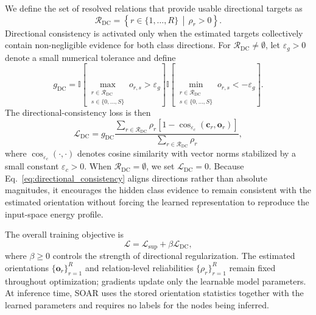 \documentclass[10pt,journal]{IEEEtran}
\begin{document}
We define the set of resolved relations that provide usable directional
targets as
\begin{equation}
\mathcal{R}_{\mathrm{DC}}
=
\left\{
r\in\{1,\ldots,R\}
\,\middle|\,
\rho_r>0
\right\}.
\label{eq:dc_relations}
\end{equation}
Directional consistency is activated only when the estimated targets
collectively contain non-negligible evidence for both class directions.
For $\mathcal{R}_{\mathrm{DC}}\neq\emptyset$, let $\varepsilon_g>0$ denote
a small numerical tolerance and define
\begin{equation}
g_{\mathrm{DC}}
=
\mathbb{I}
\left[
\max_{\substack{
r\in\mathcal{R}_{\mathrm{DC}}\\
s\in\{0,\ldots,S\}
}}
o_{r,s}
>
\varepsilon_g
\right]
\mathbb{I}
\left[
\min_{\substack{
r\in\mathcal{R}_{\mathrm{DC}}\\
s\in\{0,\ldots,S\}
}}
o_{r,s}
<
-\varepsilon_g
\right].
\label{eq:dc_gate}
\end{equation}
The directional-consistency loss is then
\begin{equation}
\mathcal{L}_{\mathrm{DC}}
=
g_{\mathrm{DC}}
\frac{
\sum_{r\in\mathcal{R}_{\mathrm{DC}}}
\rho_r
\left[
1-
\operatorname{cos}_{\varepsilon_c}
\left(
\mathbf{c}_r,
\mathbf{o}_r
\right)
\right]
}{
\sum_{r\in\mathcal{R}_{\mathrm{DC}}}\rho_r
},
\label{eq:directional_consistency}
\end{equation}
where
$\operatorname{cos}_{\varepsilon_c}(\cdot,\cdot)$ denotes cosine similarity
with vector norms stabilized by a small constant $\varepsilon_c>0$.
When $\mathcal{R}_{\mathrm{DC}}=\emptyset$, we set
$\mathcal{L}_{\mathrm{DC}}=0$.
Because Eq.~\eqref{eq:directional_consistency} aligns directions rather than
absolute magnitudes, it encourages the hidden class evidence to remain
consistent with the estimated orientation without forcing the learned
representation to reproduce the input-space energy profile.

The overall training objective is
\begin{equation}
\mathcal{L}
=
\mathcal{L}_{\mathrm{sup}}
+
\beta\mathcal{L}_{\mathrm{DC}},
\label{eq:total_loss}
\end{equation}
where $\beta\ge0$ controls the strength of directional regularization.
The estimated orientations $\{\mathbf{o}_r\}_{r=1}^{R}$ and relation-level
reliabilities $\{\rho_r\}_{r=1}^{R}$ remain fixed throughout optimization;
gradients update only the learnable model parameters. At inference time,
SOAR uses the stored orientation statistics together with the learned
parameters and requires no labels for the nodes being inferred.
\end{document}
